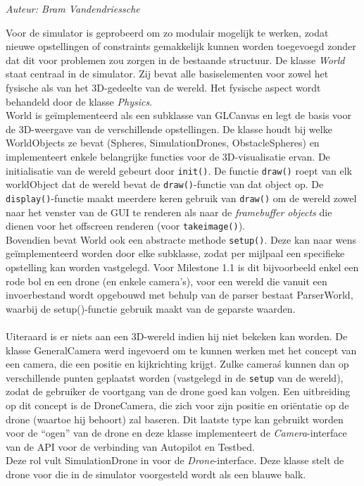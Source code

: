 {\em Auteur: Bram Vandendriessche}


\noindent
Voor de simulator is geprobeerd om zo modulair mogelijk te werken, zodat nieuwe opstellingen of constraints gemakkelijk kunnen worden toegevoegd zonder dat dit voor problemen zou zorgen in de bestaande structuur. De klasse \textit{World} staat centraal in de simulator. Zij bevat alle basiselementen voor zowel het fysische als van het 3D-gedeelte van de wereld. Het fysische aspect wordt behandeld door de klasse \textit{Physics}. %
\\

\noindent
World is ge\"implementeerd als een subklasse van GLCanvas en legt de basis voor de 3D-weergave van de verschillende opstellingen. 
De klasse houdt bij welke WorldObjects ze bevat (Spheres, SimulationDrones, ObstacleSpheres) en implementeert enkele belangrijke functies voor de 3D-visualisatie ervan. De initialisatie van de wereld gebeurt door \texttt{init()}. De functie \texttt{draw()} roept van elk worldObject dat de wereld bevat de \texttt{draw()}-functie van dat object op. De \texttt{display()}-functie maakt meerdere keren gebruik van \texttt{draw()} om de wereld zowel naar het venster van de GUI te renderen als naar de \textit{framebuffer objects} die dienen voor het offscreen renderen (voor \texttt{takeimage()}).\\
Bovendien bevat World ook een abstracte methode \texttt{setup()}. Deze kan naar wens ge\"implementeerd worden door elke subklasse, zodat per mijlpaal een specifieke opstelling kan worden vastgelegd. Voor Milestone 1.1 is dit bijvoorbeeld enkel een rode bol en een drone (en enkele camera's), voor een wereld die vanuit een invoerbestand wordt opgebouwd met behulp van de parser bestaat ParserWorld, waarbij de setup()-functie gebruik maakt van de geparste waarden.\\
\\
Uiteraard is er niets aan een 3D-wereld indien hij niet bekeken kan worden. De klasse GeneralCamera werd ingevoerd om te kunnen werken met het concept van een camera, die een positie en kijkrichting krijgt. Zulke camera\'s kunnen dan op verschillende punten geplaatst worden (vastgelegd in de \texttt{setup} van de wereld), zodat de gebruiker de voortgang van de drone goed kan volgen. Een uitbreiding op dit concept is de DroneCamera, die zich voor zijn positie en ori\"entatie op de drone (waartoe hij behoort) zal baseren. Dit laatste type kan gebruikt worden voor de ``ogen'' van de drone en deze klasse implementeert de \textit{Camera}-interface van de API voor de verbinding van Autopilot en Testbed.\\
Deze rol vult SimulationDrone in voor de \textit{Drone}-interface. Deze klasse stelt de drone voor die in de simulator voorgesteld wordt als een blauwe balk. 

